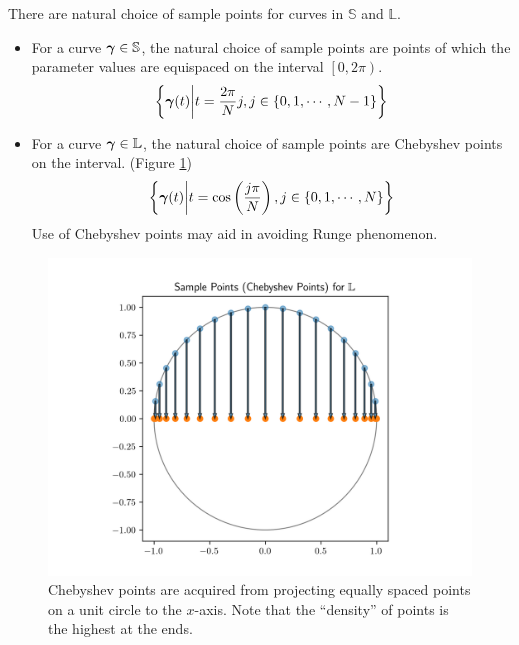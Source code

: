 \documentclass[../dissertation.tex]{subfiles}
\begin{document}
There are natural choice of sample points for curves in $\mathbb{S}$ and $\mathbb{L}$.
\begin{itemize}
    \item For a curve $\boldsymbol{\gamma} \in \mathbb{S}$, the natural choice of sample points are points of which the parameter values are equispaced on the interval $\left[ 0,2\pi \right)$.
        \begin{equation}
\left\{ \boldsymbol{\gamma}(t) \middle| t = \frac{2\pi}{N}j, j \in \left\{ 0, 1, \cdots, N-1 \right\} \right\}
        \end{equation}
    \item For a curve $\boldsymbol{\gamma} \in \mathbb{L}$, the natural choice of sample points are Chebyshev points on the interval. (Figure \ref{fig: Chebyshev Points})
        \begin{equation}
            \left\{ \boldsymbol{\gamma}(t) \middle| t = \cos \left( \frac{j \pi}{N} \right), j \in \left\{ 0, 1, \cdots, N \right\} \right\}
        \end{equation}
Use of Chebyshev points may aid in avoiding Runge phenomenon\cite{Trefethen_2020}.
\end{itemize}
\begin{figure}[tbp]
    \centering
    \includegraphics[width=\textwidth]{sections/FourierSeriesImgs/ChebyshevPoints}
    \caption{Chebyshev points are acquired from projecting equally spaced points on a unit circle to the $x$-axis.
    Note that the ``density'' of points is the highest at the ends.}
    \label{fig: Chebyshev Points}
\end{figure}
\end{document}
